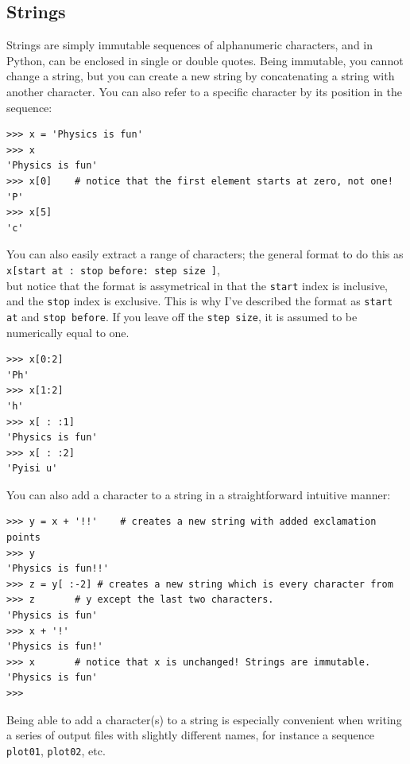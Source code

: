 \subsection{Strings}
\label{subsec-strings}
Strings are simply immutable sequences of alphanumeric characters, and in Python, can be enclosed in single or double quotes.
Being immutable, you cannot change a string, but you can create a new string by concatenating a string with another character. You can also refer to a specific character by its position in the sequence:\\[5mm]
\begin{lstlisting}[frame=none]
>>> x = 'Physics is fun'
>>> x
'Physics is fun'
>>> x[0]	# notice that the first element starts at zero, not one!
'P'
>>> x[5]
'c'
\end{lstlisting}
You can also easily extract a range of characters; the general format to do this as \\
\texttt{x[start at : stop before: step size ]},\\
but notice that the format is assymetrical in that the \texttt{start} index is inclusive, and the \texttt{stop} index is exclusive. This is why I've described the format as \texttt{start at} and \texttt{stop before}. If you leave off the \texttt{step size}, it is assumed to be numerically equal to one.
\begin{lstlisting}[frame=none]
>>> x[0:2]
'Ph'
>>> x[1:2]
'h'
>>> x[ : :1]
'Physics is fun'
>>> x[ : :2]
'Pyisi u'

\end{lstlisting}
You can also add a character to a string in a straightforward intuitive manner:
\begin{lstlisting}[frame=none]
>>> y = x + '!!'	# creates a new string with added exclamation points
>>> y
'Physics is fun!!'
>>> z = y[ :-2]	# creates a new string which is every character from
>>> z		# y except the last two characters.
'Physics is fun'
>>> x + '!'
'Physics is fun!'
>>> x 		# notice that x is unchanged! Strings are immutable.
'Physics is fun'
>>>
\end{lstlisting}
Being able to add a character(s) to a string is especially convenient when writing a series of output files with slightly different names, for instance a sequence \texttt{plot01}, \texttt{plot02}, etc. 


